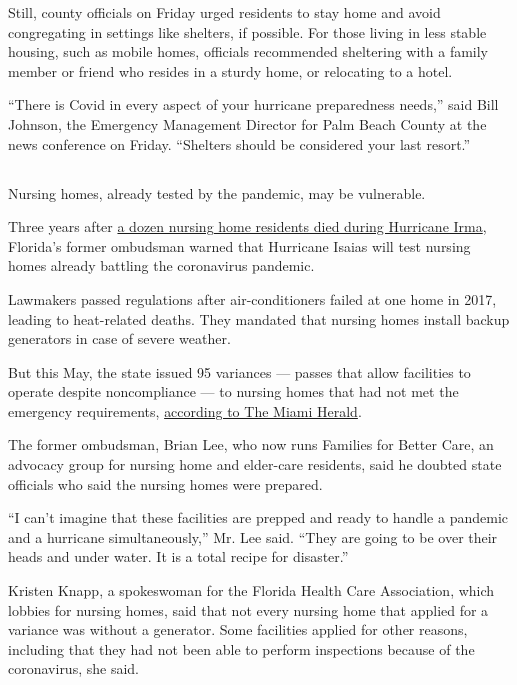 Still, county officials on Friday urged residents to stay home and avoid
congregating in settings like shelters, if possible. For those living in
less stable housing, such as mobile homes, officials recommended
sheltering with a family member or friend who resides in a sturdy home,
or relocating to a hotel.

``There is Covid in every aspect of your hurricane preparedness needs,''
said Bill Johnson, the Emergency Management Director for Palm Beach
County at the news conference on Friday. ``Shelters should be considered
your last resort.''

\hypertarget{-2}{%
\subsection{}\label{-2}}

Nursing homes, already tested by the pandemic, may be vulnerable.

Three years after
\href{https://www.nytimes.com/2019/08/24/us/4-charged-holywood-hills-deaths-hurricane-irma-florida.html}{a
dozen nursing home residents died during Hurricane Irma}, Florida's
former ombudsman warned that Hurricane Isaias will test nursing homes
already battling the coronavirus pandemic.

Lawmakers passed regulations after air-conditioners failed at one home
in 2017, leading to heat-related deaths. They mandated that nursing
homes install backup generators in case of severe weather.

But this May, the state issued 95 variances --- passes that allow
facilities to operate despite noncompliance --- to nursing homes that
had not met the emergency requirements,
\href{https://www.miamiherald.com/article242595251.html}{according to
The Miami Herald}.

The former ombudsman, Brian Lee, who now runs Families for Better Care,
an advocacy group for nursing home and elder-care residents, said he
doubted state officials who said the nursing homes were prepared.

``I can't imagine that these facilities are prepped and ready to handle
a pandemic and a hurricane simultaneously,'' Mr. Lee said. ``They are
going to be over their heads and under water. It is a total recipe for
disaster.''

Kristen Knapp, a spokeswoman for the Florida Health Care Association,
which lobbies for nursing homes, said that not every nursing home that
applied for a variance was without a generator. Some facilities applied
for other reasons, including that they had not been able to perform
inspections because of the coronavirus, she said.

